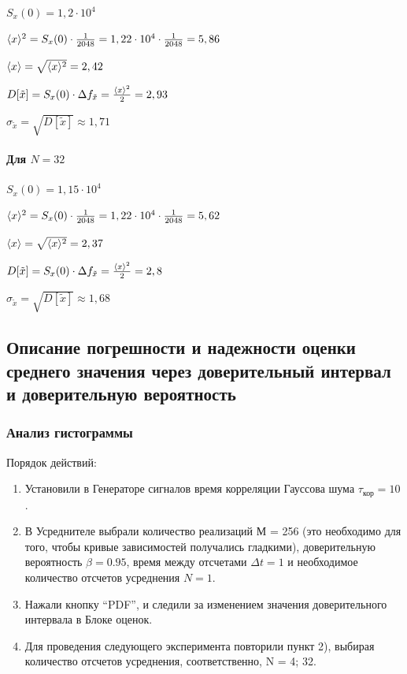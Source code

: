 $S_x(0)=1,2\cdot 10^4$

$\langle x\rangle^2 = S_x(0)\cdot \frac{1}{2048}= 1,22\cdot 10^4\cdot \frac{1}{2048} = 5,86$

$\langle x\rangle =  \sqrt{\langle x\rangle^2} = 2,42$

$D[\tilde{x}] = S_x(0)\cdot \Delta f_{\tilde{x}} =\frac{\langle x\rangle^2}{2} = 2,93$

$\sigma_{\tilde{x}} = \sqrt{D[\tilde{x}]}\approx 1,71$

\paragraph{Для $N=32$}%
$S_x(0)=1,15\cdot 10^4$

$\langle x\rangle^2 = S_x(0)\cdot \frac{1}{2048}= 1,22\cdot 10^4\cdot \frac{1}{2048} = 5,62$

$\langle x\rangle =  \sqrt{\langle x\rangle^2} = 2,37$

$D[\tilde{x}] = S_x(0)\cdot \Delta f_{\tilde{x}} =\frac{\langle x\rangle^2}{2} = 2,8$

$\sigma_{\tilde{x}} = \sqrt{D[\tilde{x}]}\approx 1,68$

\subsection[Задание 6]{Описание погрешности и надежности оценки среднего значения через доверительный интервал и доверительную вероятность}
\subsubsection[Задание 6.1]{Анализ гистограммы}
Порядок действий:
\begin{enumerate}
	\item Установили в Генераторе сигналов время корреляции Гауссова шума $\tau_\text{кор}=10$.
	\item В Усреднителе выбрали количество реализаций М = 256 (это необходимо для того, чтобы кривые зависимостей получались гладкими), доверительную вероятность $\beta = 0.95$, время между отсчетами $\Delta t = 1$ и необходимое количество отсчетов усреднения $N=1$.
	\item Нажали кнопку “PDF”, и следили за изменением значения доверительного интервала в Блоке оценок.
	\item Для проведения следующего эксперимента повторили пункт 2), выбирая количество отсчетов усреднения, соответственно, N = 4; 32.
\end{enumerate}

